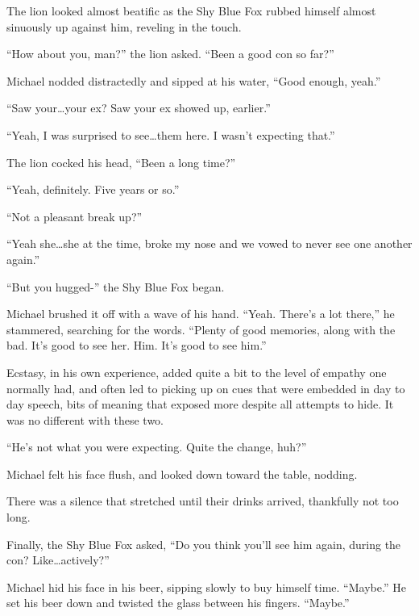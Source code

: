 The lion looked almost beatific as the Shy Blue Fox rubbed himself almost sinuously up against him, reveling in the touch.

``How about you, man?'' the lion asked.  ``Been a good con so far?''

Michael nodded distractedly and sipped at his water, ``Good enough, yeah.''

``Saw your\ldots{}your ex?  Saw your ex showed up, earlier.''

``Yeah, I was surprised to see\ldots{}them here.  I wasn't expecting that.''

The lion cocked his head, ``Been a long time?''

``Yeah, definitely.  Five years or so.''

``Not a pleasant break up?''

``Yeah she\ldots{}she at the time, broke my nose and we vowed to never see one another again.''

``But you hugged-'' the Shy Blue Fox began.

Michael brushed it off with a wave of his hand.  ``Yeah.  There's a lot there,'' he stammered, searching for the words.  ``Plenty of good memories, along with the bad.  It's good to see her.  Him.  It's good to see him.''

Ecstasy, in his own experience, added quite a bit to the level of empathy one normally had, and often led to picking up on cues that were embedded in day to day speech, bits of meaning that exposed more despite all attempts to hide.  It was no different with these two.

``He's not what you were expecting.  Quite the change, huh?''

Michael felt his face flush, and looked down toward the table, nodding.

There was a silence that stretched until their drinks arrived, thankfully not too long.

Finally, the Shy Blue Fox asked, ``Do you think you'll see him again, during the con?  Like\ldots{}actively?''

Michael hid his face in his beer, sipping slowly to buy himself time.  ``Maybe.''  He set his beer down and twisted the glass between his fingers.  ``Maybe.''
